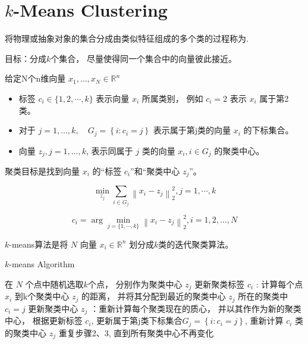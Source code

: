 \section{$k$-Means Clustering}

将物理或抽象对象的集合分成由类似特征组成的多个类的过程称为.



目标：分成$k$个集合， 尽量使得同一个集合中的向量彼此接近。 

\begin{notation}
    给定N个n维向量 $ x_{1}, \ldots, x_{N} \in \mathbb{R}^{n} $

    \begin{itemize}
        \item 标签 $ c_{i} \in\{1,2, \cdots, k\} $ 表示向量 $ x_{i} $ 所属类别， 例如 $ c_{i}=2 $ 表示 $ x_{i} $ 属于第2类。 
        \item 对于 $ j=1, \ldots, k, \quad G_{j}=\left\{i: c_{i}=j\right\} $ 表示属于第j类的向量 $ x_{i} $ 的下标集合。 
        \item 向量 $ z_{j}, j=1, \ldots, k $, 表示同属于 $ j $ 类的向量 $ x_{i}, i \in G_{j} $ 的聚类中心。 
    \end{itemize}
\end{notation}

聚类目标是找到向量 $ x_{i} $ 的“标签 $ c_{i} $”和“聚类中心 $ z_{j} $”。

\begin{problem}
    \begin{equation} \min _{z_{j}} \sum_{i \in G_{j}}\left\|x_{i}-z_{j}\right\|_{2}^{2}, j=1, \cdots, k \end{equation}

    \begin{equation} c_{i}=
    \arg \min_{j=\{1, \cdots, k\}} \left\|x_{i}-z_{j}\right\|_{2}^{2}, i=1,2, \ldots, N \end{equation}

    
\end{problem}

$k$-means算法是将 $ {N} $ 向量 $ x_{i} \in \mathbb{R}^{n} $ 划分成$k$类的迭代聚类算法。 

\begin{algorithm}
    \caption{$k$-means Algorithm}
    在 $ {N} $ 个点中随机选取$k$个点， 分别作为聚类中心 $ z_{j} $\;
    更新聚类标签 $ c_{i} $ : 计算每个点 $ x_{i} $ 到k个聚类中心 $ z_{j} $ 的距离， 并将其分配到最近的聚类中心 $ z_{j} $ 所在的聚类中 $ c_{i}=j $\;
    更新聚类中心 $ z_{j} $ ：重新计算每个聚类现在的质心， 并以其作作为新的聚类中心， 根据更新标签 $ c_{i} $, 更新属于第j类下标集合$ G_{j}=\left\{i: c_{i}=j\right\} $, 重新计算 $ c_{i} $ 类的聚类中心 $ z_{j} $\;
    重复步骤2、3, 直到所有聚类中心不再变化
\end{algorithm}


